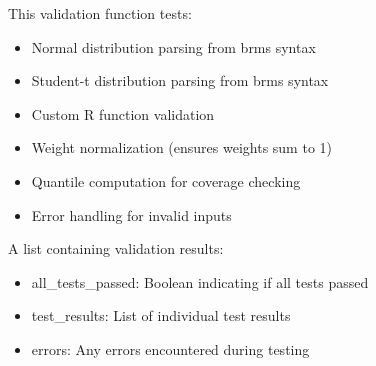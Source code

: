 \documentclass[letterpaper]{book}
\begin{document}
\begin{Details}
This validation function tests:
\begin{itemize}

\item{} Normal distribution parsing from brms syntax
\item{} Student-t distribution parsing from brms syntax
\item{} Custom R function validation
\item{} Weight normalization (ensures weights sum to 1)
\item{} Quantile computation for coverage checking
\item{} Error handling for invalid inputs

\end{itemize}

\end{Details}
%
\begin{Value}
A list containing validation results:
\begin{itemize}

\item{} all\_tests\_passed: Boolean indicating if all tests passed
\item{} test\_results: List of individual test results
\item{} errors: Any errors encountered during testing

\end{itemize}

\end{Value}
%
\begin{Examples}
\end{Examples}
\printindex{}
\end{document}
